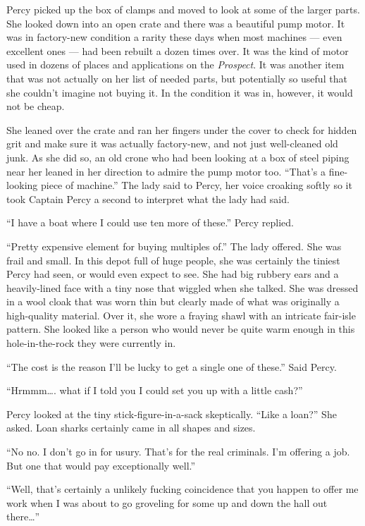 \documentclass[
]{scrbook}
\begin{document}
Percy picked up the box of clamps and moved to look at some of the
larger parts. She looked down into an open crate and there was a
beautiful pump motor. It was in factory-new condition a rarity these
days when most machines --- even excellent ones --- had been rebuilt a
dozen times over. It was the kind of motor used in dozens of places and
applications on the \emph{Prospect}. It was another item that was not
actually on her list of needed parts, but potentially so useful that she
couldn't imagine not buying it. In the condition it was in, however, it
would not be cheap.

She leaned over the crate and ran her fingers under the cover to check
for hidden grit and make sure it was actually factory-new, and not just
well-cleaned old junk. As she did so, an old crone who had been looking
at a box of steel piping near her leaned in her direction to admire the
pump motor too. ``That's a fine-looking piece of machine.'' The lady
said to Percy, her voice croaking softly so it took Captain Percy a
second to interpret what the lady had said.

``I have a boat where I could use ten more of these.'' Percy replied.

``Pretty expensive element for buying multiples of.'' The lady offered.
She was frail and small. In this depot full of huge people, she was
certainly the tiniest Percy had seen, or would even expect to see. She
had big rubbery ears and a heavily-lined face with a tiny nose that
wiggled when she talked. She was dressed in a wool cloak that was worn
thin but clearly made of what was originally a high-quality material.
Over it, she wore a fraying shawl with an intricate fair-isle pattern.
She looked like a person who would never be quite warm enough in this
hole-in-the-rock they were currently in.

``The cost is the reason I'll be lucky to get a single one of these.''
Said Percy.

``Hrmmm\ldots. what if I told you I could set you up with a little
cash?''

Percy looked at the tiny stick-figure-in-a-sack skeptically. ``Like a
loan?'' She asked. Loan sharks certainly came in all shapes and sizes.

``No no. I don't go in for usury. That's for the real criminals. I'm
offering a job. But one that would pay exceptionally well.''

``Well, that's certainly a unlikely fucking coincidence that you happen
to offer me work when I was about to go groveling for some up and down
the hall out there\ldots{}''
\end{document}

